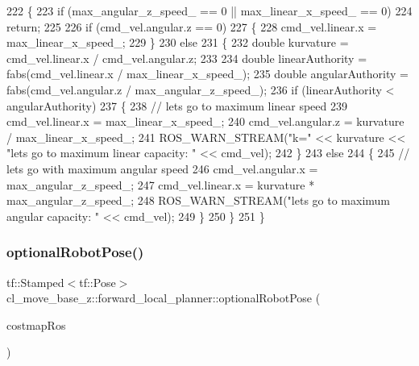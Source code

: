 \begin{DoxyCode}
222 \{
223     \textcolor{keywordflow}{if} (max\_angular\_z\_speed\_ == 0 || max\_linear\_x\_speed\_ == 0)
224         \textcolor{keywordflow}{return};
225 
226     \textcolor{keywordflow}{if} (cmd\_vel.angular.z == 0)
227     \{
228         cmd\_vel.linear.x = max\_linear\_x\_speed\_;
229     \}
230     \textcolor{keywordflow}{else}
231     \{
232         \textcolor{keywordtype}{double} kurvature = cmd\_vel.linear.x / cmd\_vel.angular.z;
233 
234         \textcolor{keywordtype}{double} linearAuthority = fabs(cmd\_vel.linear.x / max\_linear\_x\_speed\_);
235         \textcolor{keywordtype}{double} angularAuthority = fabs(cmd\_vel.angular.z / max\_angular\_z\_speed\_);
236         \textcolor{keywordflow}{if} (linearAuthority < angularAuthority)
237         \{
238             \textcolor{comment}{// lets go to maximum linear speed}
239             cmd\_vel.linear.x = max\_linear\_x\_speed\_;
240             cmd\_vel.angular.z = kurvature / max\_linear\_x\_speed\_;
241             ROS\_WARN\_STREAM(\textcolor{stringliteral}{"k="} << kurvature << \textcolor{stringliteral}{"lets go to maximum linear capacity: "} << cmd\_vel);
242         \}
243         \textcolor{keywordflow}{else}
244         \{
245             \textcolor{comment}{// lets go with maximum angular speed}
246             cmd\_vel.angular.x = max\_angular\_z\_speed\_;
247             cmd\_vel.linear.x = kurvature * max\_angular\_z\_speed\_;
248             ROS\_WARN\_STREAM(\textcolor{stringliteral}{"lets go to maximum angular capacity: "} << cmd\_vel);
249         \}
250     \}
251 \}
\end{DoxyCode}
\mbox{\label{namespacecl__move__base__z_1_1forward__local__planner_a4c20f9fe0ca67779c53e90182baf4997}} 
\subsubsection{\texorpdfstring{optional\+Robot\+Pose()}{optionalRobotPose()}}
{\footnotesize\ttfamily tf\+::\+Stamped$<$tf\+::\+Pose$>$ cl\+\_\+move\+\_\+base\+\_\+z\+::forward\+\_\+local\+\_\+planner\+::optional\+Robot\+Pose (\begin{DoxyParamCaption}\item[{costmap\+\_\+2d\+::\+Costmap2\+D\+R\+OS $\ast$}]{costmap\+Ros }\end{DoxyParamCaption})}



